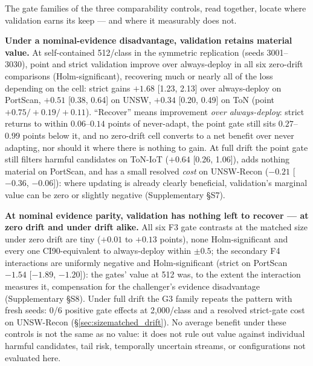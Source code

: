 \documentclass[a4paper,fleqn]{cas-sc}
\begin{document}
The gate families of the three comparability controls, read together, locate where validation earns its keep --- and where it measurably does not.

\textbf{Under a nominal-evidence disadvantage, validation retains material value.} At self-contained 512/class in the symmetric replication (seeds 3001--3030), point and strict validation improve over always-deploy in all six zero-drift comparisons (Holm-significant), recovering much or nearly all of the loss depending on the cell: strict gains $+1.68$ [1.23, 2.13] over always-deploy on PortScan, $+0.51$ [0.38, 0.64] on UNSW, $+0.34$ [0.20, 0.49] on ToN (point $+0.75/+0.19/+0.11$). ``Recover'' means improvement \emph{over always-deploy}: strict returns to within $0.06$--$0.14$ points of never-adapt, the point gate still sits $0.27$--$0.99$ points below it, and no zero-drift cell converts to a net benefit over never adapting, nor should it where there is nothing to gain. At full drift the point gate still filters harmful candidates on ToN-IoT ($+0.64$ [0.26, 1.06]), adds nothing material on PortScan, and has a small resolved \emph{cost} on UNSW-Recon ($-0.21$ [$-0.36$, $-0.06$]): where updating is already clearly beneficial, validation's marginal value can be zero or slightly negative (Supplementary \S S7).

\textbf{At nominal evidence parity, validation has nothing left to recover --- at zero drift and under drift alike.} All six F3 gate contrasts at the matched size under zero drift are tiny ($+0.01$ to $+0.13$ points), none Holm-significant and every one CI90-equivalent to always-deploy within $\pm0.5$; the secondary F4 interactions are uniformly negative and Holm-significant (strict on PortScan $-1.54$ [$-1.89$, $-1.20$]): the gates' value at 512 was, to the extent the interaction measures it, compensation for the challenger's evidence disadvantage (Supplementary \S S8). Under full drift the G3 family repeats the pattern with fresh seeds: 0/6 positive gate effects at 2{,}000/class and a resolved strict-gate cost on UNSW-Recon (\S\ref{sec:sizematched_drift}). No average benefit under these controls is not the same as no value: it does not rule out value against individual harmful candidates, tail risk, temporally uncertain streams, or configurations not evaluated here.
\end{document}
